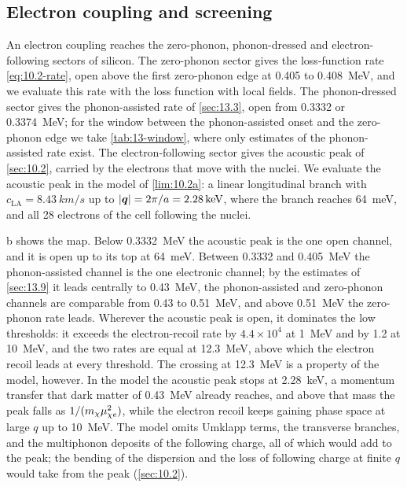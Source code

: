 \subsection{Electron coupling and screening}\label{sec:17.1-electron}

An electron coupling reaches the zero-phonon, phonon-dressed and electron-following sectors of silicon. The zero-phonon sector gives the loss-function rate \cref{eq:10.2-rate}, open above the first zero-phonon edge at 0.405 to \SI{0.408}{MeV}, and we evaluate this rate with the loss function with local fields. The phonon-dressed sector gives the phonon-assisted rate of \cref{sec:13.3}, open from 0.3332 or \SI{0.3374}{MeV}; for the window between the phonon-assisted onset and the zero-phonon edge we take \cref{tab:13-window}, where only estimates of the phonon-assisted rate exist. The electron-following sector gives the acoustic peak of \cref{sec:10.2}, carried by the electrons that move with the nuclei. We evaluate the acoustic peak in the model of \cref{lim:10.2a}: a linear longitudinal branch with $c_{\mathrm{LA}} = \SI{8.43}{km/s}$ up to $|\bm{q}| = 2\pi/a = \SI{2.28}{keV}$, where the branch reaches \SI{64}{meV}, and all 28 electrons of the cell following the nuclei.

b shows the map. Below \SI{0.3332}{MeV} the acoustic peak is the one open channel, and it is open up to its top at \SI{64}{meV}. Between 0.3332 and \SI{0.405}{MeV} the phonon-assisted channel is the one electronic channel; by the estimates of \cref{sec:13.9} it leads centrally to \SI{0.43}{MeV}, the phonon-assisted and zero-phonon channels are comparable from 0.43 to \SI{0.51}{MeV}, and above \SI{0.51}{MeV} the zero-phonon rate leads. Wherever the acoustic peak is open, it dominates the low thresholds: it exceeds the electron-recoil rate by $4.4\times10^4$ at \SI{1}{MeV} and by 1.2 at \SI{10}{MeV}, and the two rates are equal at \SI{12.3}{MeV}, above which the electron recoil leads at every threshold. The crossing at \SI{12.3}{MeV} is a property of the model, however. In the model the acoustic peak stops at \SI{2.28}{keV}, a momentum transfer that dark matter of \SI{0.43}{MeV} already reaches, and above that mass the peak falls as $1/(m_{\chi}\mu_{\chi e}^2)$, while the electron recoil keeps gaining phase space at large $q$ up to \SI{10}{MeV}. The model omits Umklapp terms, the transverse branches, and the multiphonon deposits of the following charge, all of which would add to the peak; the bending of the dispersion and the loss of following charge at finite $q$ would take from the peak (\cref{sec:10.2}).

